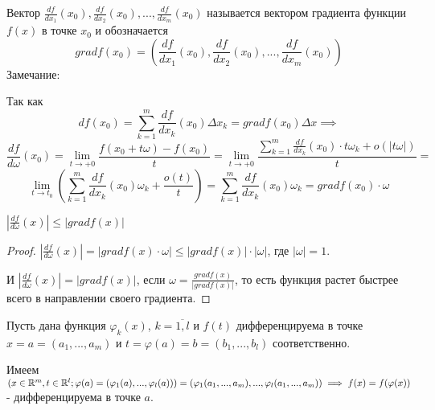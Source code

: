 \begin{definition}
    Вектор $\frac{df}{dx_1}(x_0), \frac{df}{dx_2}(x_0), ..., \frac{df}{dx_m}(x_0)$ называется вектором градиента функции $f(x)$ в точке $x_0$ и обозначается
    $$grad f(x_0) = (\frac{df}{dx_1}(x_0), \frac{df}{dx_2}(x_0), ..., \frac{df}{dx_m}(x_0))$$
    Замечание:

    Так как $$df(x_0) = \sum_{k=1}^m\frac{df}{dx_k}(x_0)\Delta x_k = grad f(x_0) \Delta x \implies$$
    $$\frac{df}{d\omega}(x_0) = \lim_{t \to +0}\frac{f(x_0+t\omega)-f(x_0)}{t} = \lim_{t \to +0}\frac{\sum_{k=1}^m\frac{df}{dx_k}(x_0)\cdot t\omega_k + o(|t\omega|)}{t} =$$
    $$\lim_{t \to t_0}(\sum_{k=1}^m\frac{df}{dx_k}(x_0)\omega_k+\frac{o(t)}{t}) = \sum_{k=1}^m\frac{df}{dx_k}(x_0)\omega_k = grad f(x_0)\cdot\omega$$
\end{definition}

\begin{theorem}
    $|\frac{df}{d\omega}(x)| \leq |grad f(x)|$
\end{theorem}
\begin{proof}
    $|\frac{df}{d\omega}(x)| = |grad f(x)\cdot\omega| \leq |grad f(x)|\cdot|\omega|$, где $|\omega| = 1$.

    И $|\frac{df}{d\omega}(x)| = |grad f(x)|$, если $\omega = \frac{gradf(x)}{|gradf(x)|}$, то есть функция растет быстрее всего в направлении своего градиента.
\end{proof}

\begin{theorem}
    Пусть дана функция $\varphi_k(x)$, $k = \overline{1,l}$ и $f(t)$ дифференцируема в точке $x = a = (a_1,...,a_m)$ и $t = \varphi(a) = b = (b_1,...,b_l)$ соответственно.
    
    Имеем $(x\in\mathbb{R}^m, t\in\mathbb{R}^l; \varphi(a) = (\varphi_1(a),...,\varphi_l(a))) = (\varphi_1(a_1,...,a_m),...,\varphi_l(a_1,...,a_m)) \implies f(x)=f(\varphi(x))$ - дифференцируема в точке $a$.
\end{theorem}